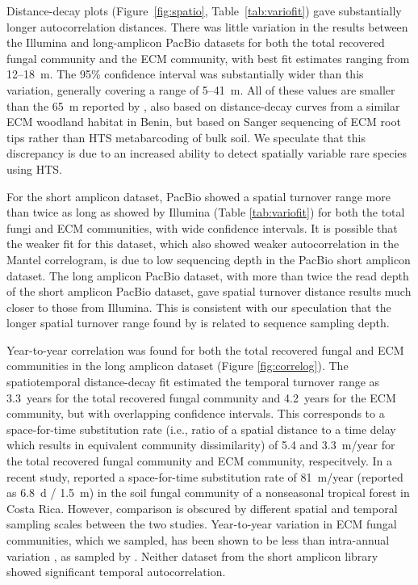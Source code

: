 \documentclass[
  12pt,
]{article}
\begin{document}
Distance-decay plots (Figure~\ref{fig:spatio}, Table~\ref{tab:variofit}) gave substantially longer autocorrelation distances.
There was little variation in the results between the Illumina and long-amplicon PacBio datasets for both the total recovered fungal community and the ECM community, with best fit estimates ranging from 12--18~m.
The 95\% confidence interval was substantially wider than this variation, generally covering a range of 5--41~m.
All of these values are smaller than the 65~m reported by \textcite{Bahram2013}, also based on distance-decay curves from a similar ECM woodland habitat in Benin, but based on Sanger sequencing of ECM root tips rather than HTS metabarcoding of bulk soil.
We speculate that this discrepancy is due to an increased ability to detect spatially variable rare species using HTS.

For the short amplicon dataset, PacBio showed a spatial turnover range more than twice as long as showed by Illumina (Table \ref{tab:variofit}) for both the total fungi and ECM communities, with wide confidence intervals.
It is possible that the weaker fit for this dataset, which also showed weaker autocorrelation in the Mantel correlogram, is due to low sequencing depth in the PacBio short amplicon dataset.
The long amplicon PacBio dataset, with more than twice the read depth of the short amplicon PacBio dataset, gave spatial turnover distance results much closer to those from Illumina.
This is consistent with our speculation that the longer spatial turnover range found by \textcite{Bahram2013} is related to sequence sampling depth.

Year-to-year correlation was found for both the total recovered fungal and ECM communities in the long amplicon dataset (Figure \ref{fig:correlog}).
The spatiotemporal distance-decay fit estimated the temporal turnover range as 3.3~years for the total recovered fungal community and 4.2~years for the ECM community, but with overlapping confidence intervals.
This corresponds to a space-for-time substitution rate (i.e., ratio of a spatial distance to a time delay which results in equivalent community dissimilarity) of 5.4 and 3.3~m/year for the total recovered fungal community and ECM community, respecitvely.
In a recent study, \textcite{kivlin2020} reported a space-for-time substitution rate of 81~m/year (reported as 6.8~d / 1.5~m) in the soil fungal community of a nonseasonal tropical forest in Costa Rica.
However, comparison is obscured by different spatial and temporal sampling scales between the two studies.
Year-to-year variation in ECM fungal communities, which we sampled, has been shown to be less than intra-annual variation \autocite{bahram2015}, as sampled by \textcite{kivlin2020}.
Neither dataset from the short amplicon library showed significant temporal autocorrelation.
\end{document}
